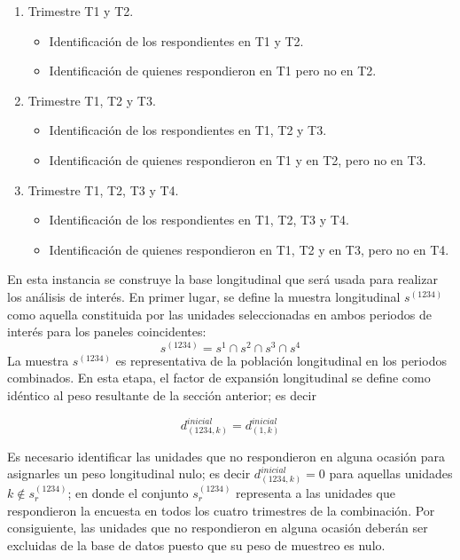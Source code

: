 \documentclass[
  10pt,
  spanish,
]{book}
\providecommand{\tightlist}{%
  \setlength{\itemsep}{0pt}\setlength{\parskip}{0pt}}
\begin{document}
\begin{enumerate}
\def\labelenumi{\arabic{enumi}.}
\tightlist
\item
  Trimestre T1 y T2.

  \begin{itemize}
  \tightlist
  \item
    Identificación de los respondientes en T1 y T2.
  \item
    Identificación de quienes respondieron en T1 pero no en T2.
  \end{itemize}
\item
  Trimestre T1, T2 y T3.

  \begin{itemize}
  \tightlist
  \item
    Identificación de los respondientes en T1, T2 y T3.
  \item
    Identificación de quienes respondieron en T1 y en T2, pero no en T3.
  \end{itemize}
\item
  Trimestre T1, T2, T3 y T4.

  \begin{itemize}
  \tightlist
  \item
    Identificación de los respondientes en T1, T2, T3 y T4.
  \item
    Identificación de quienes respondieron en T1, T2 y en T3, pero no en T4.
  \end{itemize}
\end{enumerate}

En esta instancia se construye la base longitudinal que será usada para realizar los análisis de interés. En primer lugar, se define la muestra longitudinal \(s^{(1234)}\) como aquella constituida por las unidades seleccionadas en ambos periodos de interés para los paneles coincidentes:
\[
s^{(1234)}=s^1 \cap s^2 \cap s^3 \cap s^4
\]
La muestra \(s^{(1234)}\) es representativa de la población longitudinal en los periodos combinados. En esta etapa, el factor de expansión longitudinal se define como idéntico al peso resultante de la sección anterior; es decir

\[
d_{(1234,k)}^{inicial}=d_{(1,k)}^{inicial}
\]

Es necesario identificar las unidades que no respondieron en alguna ocasión para asignarles un peso longitudinal nulo; es decir
\(d_{(1234,k)}^{inicial}=0\) para aquellas unidades \(k \notin s_r^{(1234)}\); en donde el conjunto \(s_r^{(1234)}\) representa a las unidades que respondieron la encuesta en todos los cuatro trimestres de la combinación. Por consiguiente, las unidades que no respondieron en alguna ocasión deberán ser excluidas de la base de datos puesto que su peso de muestreo es nulo.
\end{document}

